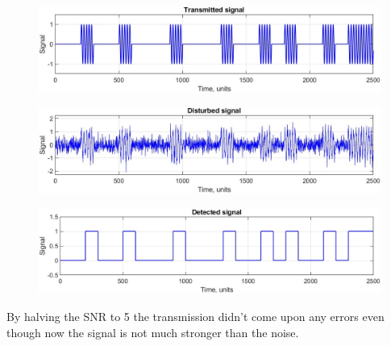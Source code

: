 \begin{figure}[h!]
    \centering
    \includegraphics[width = .85\textwidth]{lab-2/imgs/task8.2_Transmitted.jpg}
\end{figure}
\vspace{-15px}
\begin{figure}[h!]
    \centering
    \includegraphics[width = .85\textwidth]{lab-2/imgs/task8.2_Noise.jpg}
\end{figure}
\vspace{-15px}
\begin{figure}[h!]
    \centering
    \includegraphics[width = .85\textwidth]{lab-2/imgs/task8.2_Detected.jpg}
\end{figure}

\FloatBarrier\noindent By halving the SNR to 5 the transmission didn't come upon any errors even though now the signal is not much stronger than the noise.

